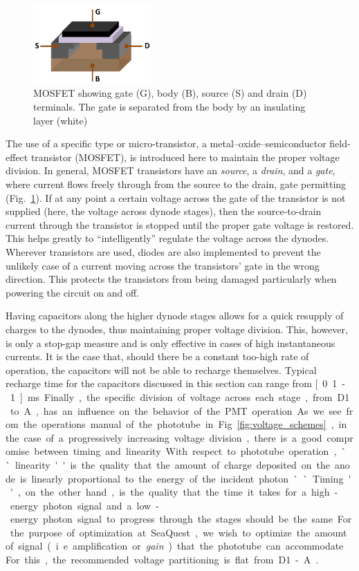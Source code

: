 \begin{figure}
	\centering
	\includegraphics[width=0.4\textwidth]{figures/pmtupgrade/MOSFET_Structure.png}
	\caption{MOSFET showing gate (G), body (B), source (S) and drain (D) terminals. The gate is separated from the body by an insulating layer (white)~\cite{wmc:mosfet}}
	\label{fig:mosfet}
\end{figure}
The use of a specific type or micro-transistor, a metal–oxide–semiconductor field-effect transistor (MOSFET), is introduced here to maintain the proper voltage division. In general, MOSFET transistors have an \emph{source}, a \emph{drain}, and a \emph{gate}, where current flows freely through from the source to the drain, gate permitting (Fig.~\ref{fig:mosfet}). If at any point a certain voltage across the gate of the transistor is not supplied (here, the voltage across dynode stages), then the source-to-drain current through the transistor is stopped until the proper gate voltage is restored. This helps greatly to ``intelligently'' regulate the voltage across the dynodes. Wherever transistors are used, diodes are also implemented to prevent the unlikely case of a current moving across the transistors' gate in the wrong direction. This protects the transistors from being damaged particularly when powering the circuit on and off.

Having capacitors along the higher dynode stages allows for a quick resupply of charges to the dynodes, thus maintaining proper voltage division. This, however, is only a stop-gap measure and is only effective in cases of high instantaneous currents. It is the case that, should there be a constant too-high rate of operation, the capacitors will not be able to recharge themselves. Typical recharge time for the capacitors discussed in this section can range from \unit[0.1-1]{ms}.

Finally, the specific division of voltage across each stage, from D1 to A, has an influence on the behavior of the PMT operation. As we see from the operations manual of the phototube in Fig.~\ref{fig:voltage_schemes}, in the case of a progressively increasing voltage division, there is a good compromise between timing and linearity. With respect to phototube operation, ``linearity'' is the quality that the amount of charge deposited on the anode is linearly proportional to the energy of the incident photon. ``Timing'', on the other hand, is the quality that the time it takes for a high-energy photon signal and a low-energy photon signal to progress through the stages should be the same. For the purpose of optimization at SeaQuest, we wish to optimize the amount of signal (i.e. amplification or \emph{gain}) that the phototube can accommodate. For this, the recommended voltage partitioning is flat from D1-A~\cite{tubespecs}.

